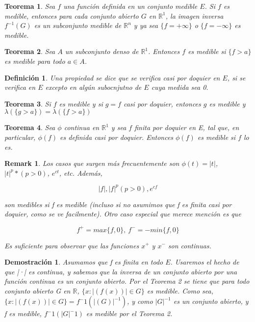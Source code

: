 \documentclass{article}
\newtheorem{theorem}{Teorema}
\newtheorem{definition}{Definición}
\newtheorem{remark}{Remark}
\newtheorem{demostration}{Demostración}
\begin{document}
\begin{theorem}
Sea $f$ una función definida en un conjunto medible $E$. Si $f$ es medible, entonces para cada conjunto abierto $G$ en $\mathbb{R}^{1}$, la imagen inversa $f^{-1}(G)$ es un subconjunto medible de $\mathbb{R}^n$ y ya sea $\{f = +\infty\}$ o $\{f = -\infty\}$ es medible.
\end{theorem}

\begin{theorem}
Sea $A$ un subconjunto denso de $\mathbb{R}^1$. Entonces $f$ es medible si $\{f > a\}$ es medible para todo $a \in A$.
\end{theorem}

\begin{definition}
Una propiedad se dice que se verifica casi por doquier en $E$, si se verifica en $E$ excepto en algún subocnjutno de $E$ cuya medida sea 0.
\end{definition}

\begin{theorem}
Si $f$ es medible y si $g = f$ casi por doquier, entonces $g$ es medible y $\lambda(\{g > a\}) = \lambda(\{f > a\})$
\end{theorem}

\begin{theorem}
Sea $\phi$ continua en $\mathbb{R}^1$ y sea $f$ finita por doquier en E, tal que, en particular, $\phi(f)$ es definida casi por doquier. Entonces $\phi(f)$ es medible si $f$ lo es.
\end{theorem}

\begin{remark}
Los casos que surgen más frecuentemente son $\phi(t) = |t|$, $|t|^p*(p > 0)$, $e^{ct}$, etc. Además,

\begin{equation}
|f|, |f|^p(p>0), e^{cf}
\end{equation}

son medibles si f es medible (incluso si no asumimos que f es finita casi por doquier, como se ve facilmente). Otro caso especial que merece mención es que 

\begin{equation}
f^+ = max\{f,0\}, \> f^-=-min\{f,0\}
\end{equation}

Es suficiente para observar que las funciones $x^+$ y $x^-$ son continuas.
\end{remark}

\begin{demostration}
Asumamos que f es finita en todo $E$. Usaremos el hecho de que |·| es continua, y sabemos que la inversa de un conjunto abierto por una función continua es un conjunto abierto. Por el Teorema 2 se tiene que para todo conjunto abierto G en $\mathbb{R}$, $\{x : |(f(x))| \in G\}$ es medible. Como sea, $\{x : |(f(x))| \in G\} = f^-1(|(G)|^{-1})$, y como $|G|^{-1}$ es un conjunto abierto, y f es medible, $f^-1(|G|^-1)$ es medible por el Teorema 2.
\end{demostration}
\end{document}
